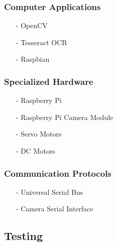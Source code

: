 \documentclass[12pt]{article}
\begin{document}
\subsubsection{Computer Applications}

\begin{itemize}[noitemsep]
	\item[-] OpenCV
	\item[-] Tesseract OCR
	\item[-] Raspbian
\end{itemize}

\subsubsection{Specialized Hardware}

\begin{itemize}[noitemsep]
	\item[-] Raspberry Pi
	\item[-] Raspberry Pi Camera Module
	\item[-] Servo Motors
	\item[-] DC Motors
\end{itemize}

\subsubsection{Communication Protocols}

\begin{itemize}[noitemsep]
	\item[-] Universal Serial Bus
	\item[-] Camera Serial Interface
\end{itemize}

\subsection{Testing}
\end{document}
